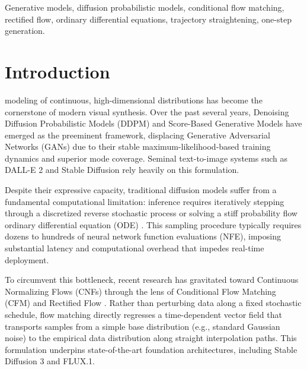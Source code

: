 \documentclass[conference]{IEEEtran}
\begin{document}
\begin{IEEEkeywords}
Generative models, diffusion probabilistic models, conditional flow matching, rectified flow, ordinary differential equations, trajectory straightening, one-step generation.
\end{IEEEkeywords}

\section{Introduction}
 modeling of continuous, high-dimensional distributions has become the cornerstone of modern visual synthesis. Over the past several years, Denoising Diffusion Probabilistic Models (DDPM) \cite{ho2020denoising} and Score-Based Generative Models \cite{song2019generative, song2020score} have emerged as the preeminent framework, displacing Generative Adversarial Networks (GANs) \cite{goodfellow2014generative} due to their stable maximum-likelihood-based training dynamics and superior mode coverage. Seminal text-to-image systems such as DALL-E 2 \cite{ramesh2022hierarchical} and Stable Diffusion \cite{rombach2022high} rely heavily on this formulation.

Despite their expressive capacity, traditional diffusion models suffer from a fundamental computational limitation: inference requires iteratively stepping through a discretized reverse stochastic process or solving a stiff probability flow ordinary differential equation (ODE) \cite{song2020denoising}. This sampling procedure typically requires dozens to hundreds of neural network function evaluations (NFE), imposing substantial latency and computational overhead that impedes real-time deployment.

To circumvent this bottleneck, recent research has gravitated toward Continuous Normalizing Flows (CNFs) \cite{chen2018neural} through the lens of Conditional Flow Matching (CFM) \cite{lipman2022flow} and Rectified Flow \cite{liu2022flow, albergo2022building}. Rather than perturbing data along a fixed stochastic schedule, flow matching directly regresses a time-dependent vector field that transports samples from a simple base distribution (e.g., standard Gaussian noise) to the empirical data distribution along straight interpolation paths. This formulation underpins state-of-the-art foundation architectures, including Stable Diffusion 3 \cite{esser2024scaling} and FLUX.1.
\end{document}
